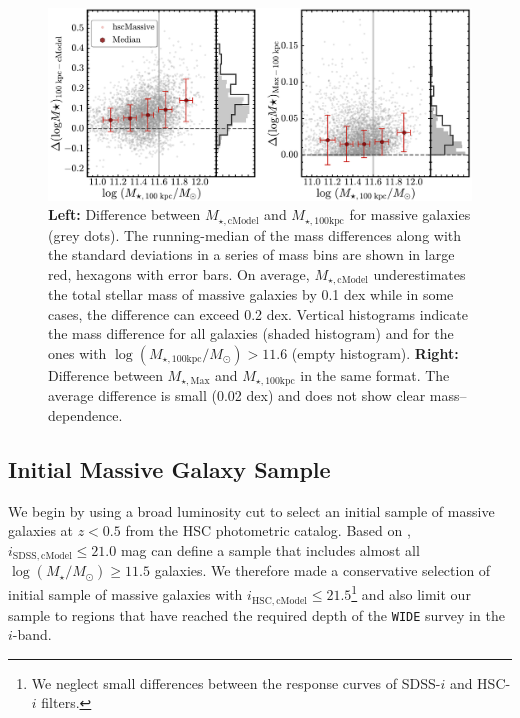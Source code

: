 \documentclass[a4paper,fleqn,usenatbib]{mnras}
\def\logms{{$\log (M_{\star}/M_{\odot})$}}
\def\mtot{{$M_{\star,100\mathrm{kpc}}$}}
\def\mmax{{$M_{\star,\mathrm{Max}}$}}
\def\mcmodel{{$M_{\star,\mathrm{cModel}}$}}
\def\logmtot{{$\log (M_{\star,100\mathrm{kpc}}/M_{\odot})$}}
\begin{document}
  \begin{figure}
      \centering 
      \includegraphics[width=\textwidth]{fig/redbcg_mass_diff_new}
      \caption{              
          \textbf{Left:} Difference between \mcmodel{} and \mtot{} for massive
      	  galaxies (grey dots).
      	  The running-median of the mass differences along with the standard deviations
      	  in a series of mass bins are shown in large red, hexagons with error bars. 
          On average, \mcmodel{} underestimates the total stellar mass of massive 
          galaxies by 0.1 dex while in some cases, the difference can exceed 0.2 dex.
          Vertical histograms indicate the mass difference for all galaxies (shaded 
          histogram) and for the ones with \logmtot{}$>11.6$ (empty histogram).
          \textbf{Right:} Difference between \mmax{} and \mtot{} in the same format. 
          The average difference is small (0.02 dex) and does not show 
          clear mass--dependence. 
          }
      \label{fig:mass_diff}
  \end{figure}
          
    
\subsection{Initial Massive Galaxy Sample}
    \label{ssec:initial}
    
    We begin by using a broad luminosity cut to select an initial sample of massive 
    galaxies at $z < 0.5$ from the HSC photometric catalog. 
    Based on \citet{Leauthaud2016}, $i_{\mathrm{SDSS, cModel}} \leq 21.0$ mag can 
    define a sample that includes almost all \logms{}$\geq 11.5$ galaxies.    
    We therefore made a conservative selection of initial sample of massive galaxies
    with $i_{\mathrm{HSC, cModel}} \leq 21.5$\footnote{We neglect small differences
    between the response curves of SDSS-$i$ and HSC-$i$ filters.}
    and also limit our sample to regions that have reached the required depth of 
    the \texttt{WIDE} survey in the $i$-band.
    
\end{document}
